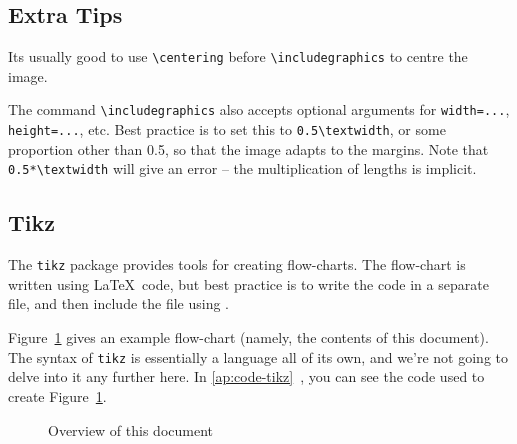 \subsection{Extra Tips}
Its usually good to use \lstinline|\centering| before \lstinline|\includegraphics| to centre the image.
\par
The command \lstinline|\includegraphics| also accepts optional arguments for \lstinline|width=...|, \lstinline|height=...|, etc.
Best practice is to set this to \lstinline|0.5\textwidth|, or some proportion other than 0.5,
so that the image adapts to the margins.
Note that \lstinline|0.5*\textwidth| will give an error -- the multiplication of lengths is implicit.
\subsection{Tikz}
The \lstinline|tikz| package provides tools for creating flow-charts.
The flow-chart is written using \LaTeX\ code,
but best practice is to write the code in a separate file,
and then include the file using \lstinline||.
\par
Figure~\ref{fig:structure} gives an example flow-chart (namely, the contents of this document).
The syntax of \lstinline|tikz| is essentially a language all of its own,
and we're not going to delve into it any further here.
In \ref{ap:code-tikz}~, you can see the code used to create Figure~\ref{fig:structure}.
\begin{figure}
    \centering
    
    \caption{Overview of this document}
    \label{fig:structure}
\end{figure}

